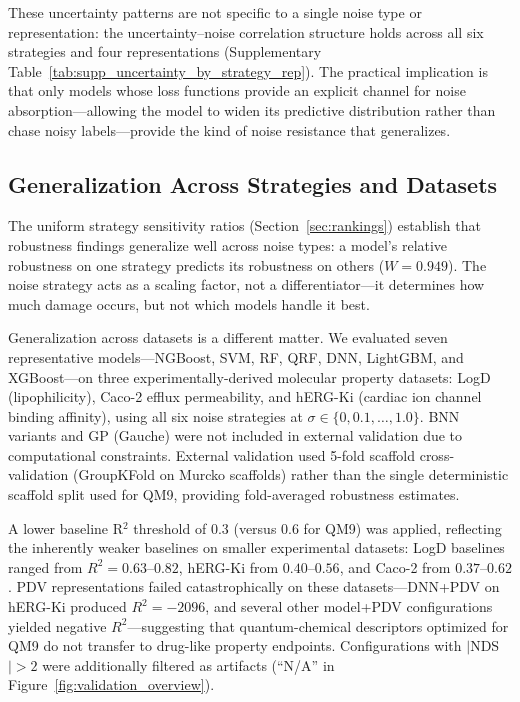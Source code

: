 \documentclass[pdflatex,sn-mathphys-num]{sn-jnl}%
\theoremstyle{thmstyleone}%
\theoremstyle{thmstyletwo}%
\theoremstyle{thmstylethree}%
\begin{document}
These uncertainty patterns are not specific to a single noise type or representation: the uncertainty--noise correlation structure holds across all six strategies and four representations (Supplementary Table~\ref{tab:supp_uncertainty_by_strategy_rep}). The practical implication is that only models whose loss functions provide an explicit channel for noise absorption---allowing the model to widen its predictive distribution rather than chase noisy labels---provide the kind of noise resistance that generalizes.

\subsection{Generalization Across Strategies and Datasets}\label{sec:generalization}

The uniform strategy sensitivity ratios (Section~\ref{sec:rankings}) establish that robustness findings generalize well across noise types: a model's relative robustness on one strategy predicts its robustness on others ($W = 0.949$). The noise strategy acts as a scaling factor, not a differentiator---it determines how much damage occurs, but not which models handle it best.

Generalization across datasets is a different matter. We evaluated seven representative models---NGBoost, SVM, RF, QRF, DNN, LightGBM, and XGBoost---on three experimentally-derived molecular property datasets: LogD (lipophilicity), Caco-2 efflux permeability, and hERG-Ki (cardiac ion channel binding affinity), using all six noise strategies at $\sigma \in \{0, 0.1, \ldots, 1.0\}$. BNN variants and GP (Gauche) were not included in external validation due to computational constraints. External validation used 5-fold scaffold cross-validation (GroupKFold on Murcko scaffolds) rather than the single deterministic scaffold split used for QM9, providing fold-averaged robustness estimates.

A lower baseline R$^2$ threshold of 0.3 (versus 0.6 for QM9) was applied, reflecting the inherently weaker baselines on smaller experimental datasets: LogD baselines ranged from $R^2 = 0.63$--$0.82$, hERG-Ki from $0.40$--$0.56$, and Caco-2 from $0.37$--$0.62$. PDV representations failed catastrophically on these datasets---DNN+PDV on hERG-Ki produced $R^2 = -2096$, and several other model+PDV configurations yielded negative $R^2$---suggesting that quantum-chemical descriptors optimized for QM9 do not transfer to drug-like property endpoints. Configurations with $|$NDS$| > 2$ were additionally filtered as artifacts (``N/A'' in Figure~\ref{fig:validation_overview}).
\end{document}
